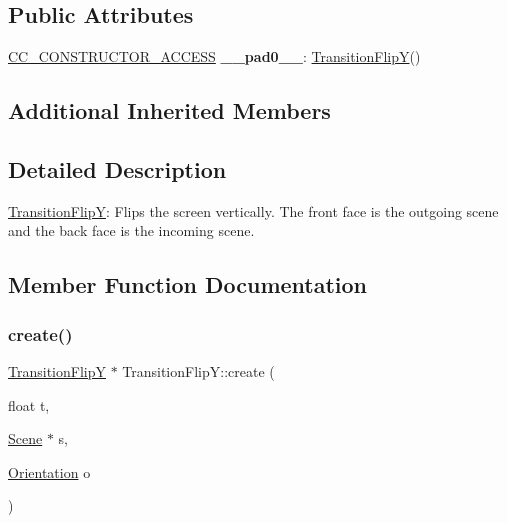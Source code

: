 \subsection*{Public Attributes}
\begin{DoxyCompactItemize}
\item 
\mbox{\label{classTransitionFlipY_ab0ad1f7263f7bf4ffdac890a73c2b83c}} 
\hyperlink{_2cocos2d_2cocos_2base_2ccConfig_8h_a25ef1314f97c35a2ed3d029b0ead6da0}{C\+C\+\_\+\+C\+O\+N\+S\+T\+R\+U\+C\+T\+O\+R\+\_\+\+A\+C\+C\+E\+SS} {\bfseries \+\_\+\+\_\+pad0\+\_\+\+\_\+}\+: \hyperlink{classTransitionFlipY}{Transition\+FlipY}()
\end{DoxyCompactItemize}
\subsection*{Additional Inherited Members}


\subsection{Detailed Description}
\hyperlink{classTransitionFlipY}{Transition\+FlipY}\+: Flips the screen vertically. The front face is the outgoing scene and the back face is the incoming scene. 

\subsection{Member Function Documentation}
\mbox{\label{classTransitionFlipY_ad2b713d0792a2726dd92f953b2afdfdb}} 
\subsubsection{\texorpdfstring{create()}{create()}\hspace{0.1cm}{\footnotesize\ttfamily [1/4]}}
{\footnotesize\ttfamily \hyperlink{classTransitionFlipY}{Transition\+FlipY} $\ast$ Transition\+Flip\+Y\+::create (\begin{DoxyParamCaption}\item[{float}]{t,  }\item[{\hyperlink{classScene}{Scene} $\ast$}]{s,  }\item[{\hyperlink{classTransitionScene_a0b2b247806fb10a20de0cbc554210c4d}{Orientation}}]{o }\end{DoxyParamCaption})\hspace{0.3cm}{\ttfamily [static]}}

